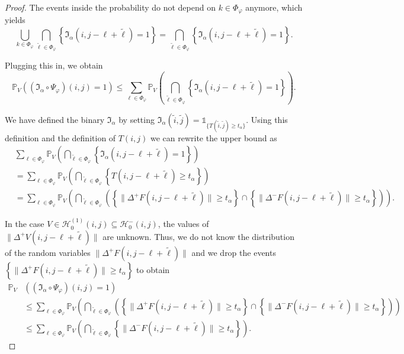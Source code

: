 \documentclass[a4paper,12pt]{article}
\newcommand{\norm}[1]{\lVert#1\rVert}
\theoremstyle{plain}
\theoremstyle{definition}
\begin{document}
\begin{proof}
	The events inside the probability do not depend on $k \in \Phi_\varphi$ anymore, which yields
	\begin{equation*}
		\bigcup_{k \in \Phi_\varphi} \bigcap_{\tilde{\ell} \in \Phi_\varphi} \left\{ \mathfrak{I}_\alpha(i, j - \ell + \tilde{\ell}) = 1 \right\} = \bigcap_{\tilde{\ell} \in \Phi_\varphi} \left\{ \mathfrak{I}_\alpha(i, j - \ell + \tilde{\ell}) = 1 \right\}.
	\end{equation*}
	
	Plugging this in, we obtain
	\begin{equation*}
		\mathbb{P}_V\left( (\mathfrak{I}_\alpha \circ \Psi_\varphi)(i, j) = 1 \right) \leq \sum_{\ell \in \Phi_\varphi} \mathbb{P}_V\left( \bigcap_{\tilde{\ell} \in \Phi_\varphi} \left\{ \mathfrak{I}_\alpha(i, j - \ell + \tilde{\ell}) = 1 \right\} \right).
	\end{equation*}
	
	We have defined the binary $\mathfrak{I}_\alpha$ by setting $\mathfrak{I}_\alpha(\tilde{i}, \tilde{j}) = \mathds{1}_{ \{ T(\tilde{i}, \tilde{j}) \geq t_\alpha \} }$. Using this definition and the definition of $T(i, j)$ we can rewrite the upper bound as
	\begin{align*}
		&\sum_{\ell \in \Phi_\varphi} \mathbb{P}_V\left( \bigcap_{\tilde{\ell} \in \Phi_\varphi} \left\{ \mathfrak{I}_\alpha(i, j - \ell + \tilde{\ell}) = 1 \right\} \right) \\
		&= \sum_{\ell \in \Phi_\varphi} \mathbb{P}_V\left( \bigcap_{\tilde{\ell} \in \Phi_\varphi} \left\{ T(i, j - \ell + \tilde{\ell}) \geq t_\alpha \right\} \right) \\
		&= \sum_{\ell \in \Phi_\varphi} \mathbb{P}_V\left( \bigcap_{\tilde{\ell} \in \Phi_\varphi} \left( \left\{ \norm{\Delta^+ F(i, j - \ell + \tilde{\ell})} \geq t_\alpha \right\} \cap \left\{ \norm{\Delta^- F(i, j - \ell + \tilde{\ell})} \geq t_\alpha \right\} \right) \right).
	\end{align*}
	
	In the case $V \in \mathcal{H}_0^{(1)}(i, j) \subseteq \mathcal{H}_0^-(i, j)$, the values of $\norm{\Delta^+ V(i, j - \ell + \tilde{\ell})}$ are unknown. Thus, we do not know the distribution of the random variables $\norm{\Delta^+ F(i, j - \ell + \tilde{\ell})}$ and we drop the events $\left\{ \norm{\Delta^+ F(i, j - \ell + \tilde{\ell})} \geq t_\alpha \right\}$ to obtain
	\begin{align*}
		\mathbb{P}_V&\left( (\mathfrak{I}_\alpha \circ \Psi_\varphi)(i, j) = 1 \right) \\
		&\leq \sum_{\ell \in \Phi_\varphi} \mathbb{P}_V\left( \bigcap_{\tilde{\ell} \in \Phi_\varphi} \left( \left\{ \norm{\Delta^+ F(i, j - \ell + \tilde{\ell})} \geq t_\alpha \right\} \cap \left\{ \norm{\Delta^- F(i, j - \ell + \tilde{\ell})} \geq t_\alpha \right\} \right) \right) \\
		&\leq \sum_{\ell \in \Phi_\varphi} \mathbb{P}_V\left( \bigcap_{\tilde{\ell} \in \Phi_\varphi} \left\{ \norm{\Delta^- F(i, j - \ell + \tilde{\ell})} \geq t_\alpha \right\} \right).
	\end{align*}
	

\end{proof}
\end{document}
